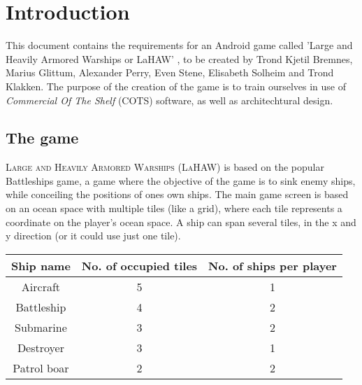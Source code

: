 \chapter{Introduction}
This document contains the requirements for an Android game called 'Large and Heavily Armored Warships or LaHAW' , to be created by Trond Kjetil Bremnes, Marius Glittum, Alexander Perry, Even Stene, Elisabeth Solheim and Trond Klakken. The purpose of the creation of the game is to train ourselves in use of \emph{Commercial Of The Shelf} (COTS) software, as well as architechtural design.

\section{The game}
\textsc{Large and Heavily Armored Warships (LaHAW)} is based on the popular Battleships\cite{battleship} game, a game where the objective of the game is to sink enemy ships, while conceiling the positions of ones own ships. The main game screen is based on an ocean space with multiple tiles (like a grid), where each tile represents a coordinate on the player's ocean space. A ship can span several tiles, in the x and y direction (or it could use just one tile). 
\\


\begin{tabular}{| c | c | c |}
    \hline
    \rowcolor[gray]{0.8}
    \hspace{0.3cm}\textbf{Ship name}\hspace{0.3cm} & \textbf{No. of occupied tiles} & \textbf{No. of ships per player} \\
    \hline
    Aircraft & 5 & 1 \\
    Battleship & 4 & 2 \\
    Submarine & 3 & 2 \\
    Destroyer & 3 & 1 \\
    Patrol boar & 2 & 2 \\
    \hline
\end{tabular}
\label{shiptable}